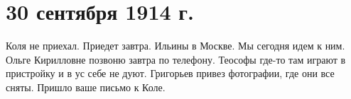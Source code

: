 \section{30 сентября 1914 г.}


Коля не приехал. Приедет завтра. Ильины в Москве. Мы сегодня идем к ним. Ольге
Кирилловне позвоню завтра по телефону. Теософы где-то там играют в пристройку и
в ус себе не дуют. Григорьев привез фотографии, где они все сняты. Пришло ваше
письмо к Коле.
